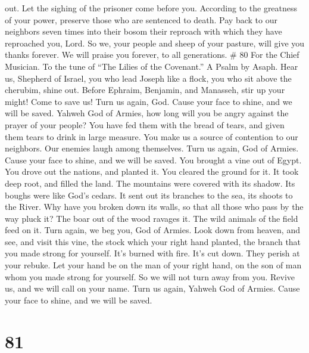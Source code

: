 out.  Let the sighing of the prisoner come before you.
According to the greatness of your power, preserve those who are
sentenced to death.  Pay back to our neighbors seven times
into their bosom their reproach with which they have reproached you,
Lord.  So we, your people and sheep of your pasture, will
give you thanks forever. We will praise you forever, to all generations.
\# 80 For the Chief Musician. To the tune of ``The Lilies of the
Covenant.'' A Psalm by Asaph.  Hear us, Shepherd of Israel,
you who lead Joseph like a flock, you who sit above the cherubim, shine
out.  Before Ephraim, Benjamin, and Manasseh, stir up your
might! Come to save us!  Turn us again, God. Cause your face
to shine, and we will be saved.  Yahweh God of Armies, how
long will you be angry against the prayer of your people? 
You have fed them with the bread of tears, and given them tears to drink
in large measure.  You make us a source of contention to our
neighbors. Our enemies laugh among themselves.  Turn us
again, God of Armies. Cause your face to shine, and we will be saved.
 You brought a vine out of Egypt. You drove out the nations,
and planted it.  You cleared the ground for it. It took deep
root, and filled the land.  The mountains were covered with
its shadow. Its boughs were like God's cedars.  It sent out
its branches to the sea, its shoots to the River.  Why have
you broken down its walls, so that all those who pass by the way pluck
it?  The boar out of the wood ravages it. The wild animals
of the field feed on it.  Turn again, we beg you, God of
Armies. Look down from heaven, and see, and visit this vine,
 the stock which your right hand planted, the branch that
you made strong for yourself.  It's burned with fire. It's
cut down. They perish at your rebuke.  Let your hand be on
the man of your right hand, on the son of man whom you made strong for
yourself.  So we will not turn away from you. Revive us,
and we will call on your name.  Turn us again, Yahweh God
of Armies. Cause your face to shine, and we will be saved.

\hypertarget{section-71}{%
\section{81}\label{section-71}}

